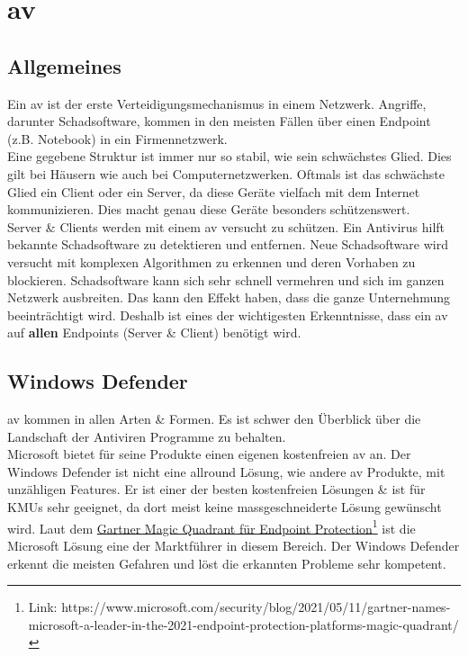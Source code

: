\chapter{\acrlong{av}}
\section{Allgemeines} %
Ein \acrfull{av} ist der erste Verteidigungsmechanismus in einem Netzwerk. Angriffe, darunter Schadsoftware, kommen in den meisten Fällen über einen Endpoint (z.B. Notebook) in ein Firmennetzwerk.\\

Eine gegebene Struktur ist immer nur so stabil, wie sein schwächstes Glied. Dies gilt bei Häusern wie auch bei Computernetzwerken.
Oftmals ist das schwächste Glied ein Client oder ein Server, da diese Geräte vielfach mit dem Internet kommunizieren.
Dies macht genau diese Geräte besonders schützenswert.\\

Server \& Clients werden mit einem \acrlong{av} versucht zu schützen. Ein Antivirus hilft bekannte Schadsoftware zu detektieren und entfernen.
Neue Schadsoftware wird versucht mit komplexen Algorithmen zu erkennen und deren Vorhaben zu blockieren.
Schadsoftware kann sich sehr schnell vermehren und sich im ganzen Netzwerk ausbreiten. 
Das kann den Effekt haben, dass die ganze Unternehmung beeinträchtigt wird.
Deshalb ist eines der wichtigesten Erkenntnisse, dass ein \acrlong{av} auf \textbf{allen} Endpoints (Server \& Client) benötigt wird.





\section{Windows Defender}
\acrfull{av} kommen in allen Arten \& Formen.
Es ist schwer den Überblick über die Landschaft der Antiviren Programme zu behalten.\\


Microsoft bietet für seine Produkte einen eigenen kostenfreien \acrlong{av} an.
Der Windows Defender ist nicht eine allround Lösung, wie andere \acrshort{av} Produkte, mit unzähligen Features.
Er ist einer der besten kostenfreien Lösungen \& ist für KMUs sehr geeignet, da dort meist keine massgeschneiderte Lösung gewünscht wird.
Laut dem \href{https://www.microsoft.com/security/blog/2021/05/11/gartner-names-microsoft-a-leader-in-the-2021-endpoint-protection-platforms-magic-quadrant/}{Gartner Magic Quadrant für Endpoint Protection}\footnote{Link: https://www.microsoft.com/security/blog/2021/05/11/gartner-names-microsoft-a-leader-in-the-2021-endpoint-protection-platforms-magic-quadrant/} ist die Microsoft Lösung eine der Marktführer in diesem Bereich.
Der Windows Defender erkennt die meisten Gefahren und löst die erkannten Probleme sehr kompetent.\\


